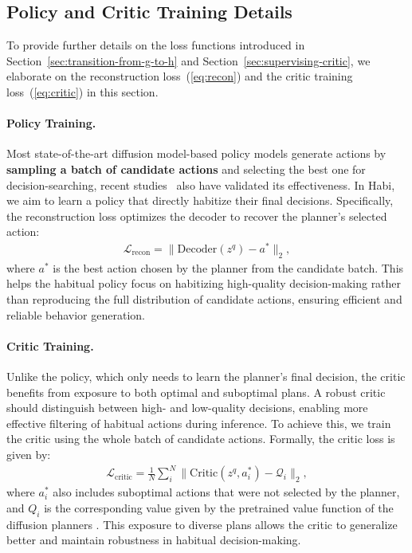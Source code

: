 \subsection{Policy and Critic Training Details}
\label{appendix:reconstruction-critic}

To provide further details on the loss functions introduced in Section~\ref{sec:transition-from-g-to-h} and Section~\ref{sec:supervising-critic}, we elaborate on the reconstruction loss~(\cref{eq:recon}) and the critic training loss~(\cref{eq:critic}) in this section.

\paragraph{Policy Training.}
Most state-of-the-art diffusion model-based policy models generate actions by \textbf{sampling a batch of candidate actions }and selecting the best one for decision-searching, recent studies~\cite{wang2023diffusion, dong2024cleandiffuser, lu2025what} also have validated its effectiveness. In Habi, we aim to learn a policy that directly habitize their final decisions. Specifically, the reconstruction loss optimizes the decoder to recover the planner's selected action:
\begin{align}
\mathcal{L}_{\mathrm{recon}} = \big\lVert\mathrm{Decoder}(z^q) - a^* \big\rVert_2,
\label{eq:appendix-recon}
\end{align}
where $a^*$ is the best action chosen by the planner from the candidate batch. This helps the habitual policy focus on habitizing high-quality decision-making rather than reproducing the full distribution of candidate actions, ensuring efficient and reliable behavior generation.

\paragraph{Critic Training.}
Unlike the policy, which only needs to learn the planner’s final decision, the critic benefits from exposure to both optimal and suboptimal plans. A robust critic should distinguish between high- and low-quality decisions, enabling more effective filtering of habitual actions during inference. To achieve this, we train the critic using the whole batch of candidate actions. Formally, the critic loss is given by:
\begin{align}
\mathcal{L}_{\mathrm{critic}} = \frac1N \sum_i^N \big\lVert\mathrm{Critic}(z^q, a_i^*) - \mathcal{Q}_i \big\rVert_2,
\end{align}
where $a_i^*$ also includes suboptimal actions that were not selected by the planner, and $Q_i$ is the corresponding value given by the pretrained value function of the diffusion planners \citep{wang2023diffusion, lu2025what}. This exposure to diverse plans allows the critic to generalize better and maintain robustness in habitual decision-making.

